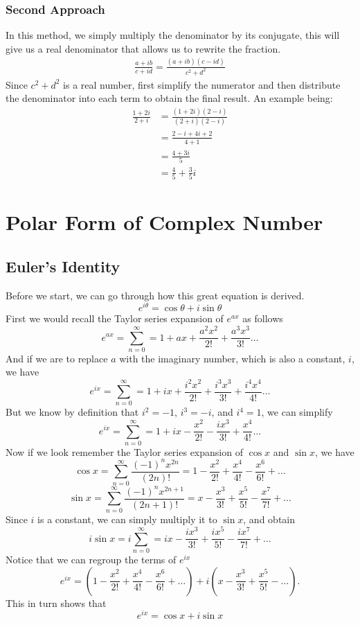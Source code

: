 \documentclass[12pt]{book}
\begin{document}
\subsubsection{Second Approach}
In this method, we simply multiply the denominator by its conjugate, this will give us a real denominator that allows us to rewrite the fraction. 
\begin{align}
    \frac{a+ib}{c+id} = \frac{(a+ib)(c-id)}{c^2+d^2}
\end{align}
Since $c^2 + d^2$ is a real number, first simplify the numerator and then distribute the denominator into each term to obtain the final result. An example being:
\begin{align*}
    \frac{1+2i}{2+i} &= \frac{(1+2i)(2-i)}{(2+i)(2-i)}\\
                     &= \frac{2 - i + 4i + 2}{4+1}\\
                     &= \frac{4+3i}{5}\\
                     &=\frac{4}{5}+\frac{3}{5}i
\end{align*}

\newpage
\section{Polar Form of Complex Number}
\subsection{Euler's Identity}
Before we start, we can go through how this great equation is derived.
\[
e^{i\theta} = \cos\theta+i\sin\theta
\]
First we would recall the Taylor series expansion of $e^{ax}$ as follows
\[
e^{ax} = \sum_{n=0}^{\infty} =1 + ax + \frac{a^2x^2}{2!}+ \frac{a^3x^3}{3!}\ldots
\]
And if we are to replace $a$ with the imaginary number, which is also a constant, $i$, we have
\[
e^{ix} = \sum_{n=0}^{\infty} =1 + ix + \frac{i^2x^2}{2!}+ \frac{i^3x^3}{3!}+\frac{i^4x^4}{4!}\ldots
\]
But we know by definition that $i^2 = -1$, $i^3 = -i$, and $i^4=1$, we can simplify
\[
e^{ix} = \sum_{n=0}^{\infty} =1 + ix - \frac{x^2}{2!} - \frac{ix^3}{3!} + \frac{x^4}{4!} \ldots
\]
Now if we look remember the Taylor series expansion of $\cos x$ and $\sin x$, we have
\[
\cos x = \sum_{n=0}^{\infty} \frac{(-1)^n x^{2n}}{(2n)!} = 1 - \frac{x^2}{2!} + \frac{x^4}{4!} - \frac{x^6}{6!} + \ldots
\]
\[
\sin x = \sum_{n=0}^{\infty} \frac{(-1)^n x^{2n+1}}{(2n+1)!} = x - \frac{x^3}{3!} + \frac{x^5}{5!} - \frac{x^7}{7!} + \ldots
\]
Since $i$ is a constant, we can simply multiply it to $\sin x$, and obtain
\[
i\sin x = i\sum_{n=0}^{\infty} = ix - \frac{ix^3}{3!} + \frac{ix^5}{5!} - \frac{ix^7}{7!} + \ldots
\]
Notice that we can regroup the terms of $e^{ix}$
\[
e^{ix} = \left(1 - \frac{x^2}{2!} + \frac{x^4}{4!} - \frac{x^6}{6!} + \ldots \right) + i \left(x - \frac{x^3}{3!} + \frac{x^5}{5!} - \ldots \right).
\]
This in turn shows that
\[
e^{ix} = \cos x + i\sin x
\]
\end{document}
